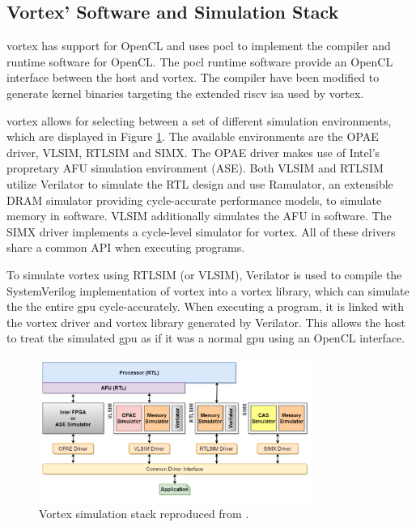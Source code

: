 \subsection{Vortex' Software and Simulation Stack}

\Gls{vortex} has support for OpenCL and uses \Gls{pocl}\cite{pocl} to implement the compiler and runtime software for OpenCL. The \gls{pocl} runtime software provide an OpenCL interface between the host and \Gls{vortex}. The compiler have been modified to generate kernel binaries targeting the extended \gls{riscv} \acrshort{isa} used by \Gls{vortex}.

\Gls{vortex} allows for selecting between a set of different simulation environments, which are displayed in Figure \ref{fig:simstack}. The available environments are the OPAE driver, VLSIM, RTLSIM and SIMX. The OPAE driver makes use of Intel's propretary AFU simulation environment (ASE). Both VLSIM and RTLSIM utilize Verilator to simulate the RTL design and use Ramulator\cite{Ramulator}, an extensible DRAM simulator providing cycle-accurate performance models, to simulate memory in software. VLSIM additionally simulates the AFU in software. The SIMX driver implements a cycle-level simulator for \Gls{vortex}. All of these drivers share a common API when executing programs. 

To simulate \Gls{vortex} using RTLSIM (or VLSIM), Verilator\cite{verilator} is used to compile the SystemVerilog implementation of \Gls{vortex} into a vortex library, which can simulate the the entire \acrshort{gpu} cycle-accurately. When executing a program, it is linked with the \Gls{vortex} driver and \Gls{vortex} library generated by Verilator. This allows the host to treat the simulated \acrshort{gpu} as if it was a normal \acrshort{gpu} using an OpenCL interface.


\begin{figure}
    \centering
    \includegraphics[width=0.8\textwidth]{figures/simstack.png}
    \caption[Vortex simulation stack]{Vortex simulation stack reproduced from \cite{vortex}.}
    \label{fig:simstack}
\end{figure}

